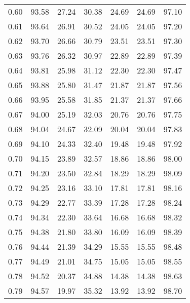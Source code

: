 \begin{tabular}{|c|c|c|c|c|c|c|}
      0.60 &     93.58 &     27.24 &      30.38 &   24.69 &      24.69 &         97.10 \\
      0.61 &     93.64 &     26.91 &      30.52 &   24.05 &      24.05 &         97.20 \\
      0.62 &     93.70 &     26.66 &      30.79 &   23.51 &      23.51 &         97.30 \\
      0.63 &     93.76 &     26.32 &      30.97 &   22.89 &      22.89 &         97.39 \\
      0.64 &     93.81 &     25.98 &      31.12 &   22.30 &      22.30 &         97.47 \\
      0.65 &     93.88 &     25.80 &      31.47 &   21.87 &      21.87 &         97.56 \\
      0.66 &     93.95 &     25.58 &      31.85 &   21.37 &      21.37 &         97.66 \\
      0.67 &     94.00 &     25.19 &      32.03 &   20.76 &      20.76 &         97.75 \\
      0.68 &     94.04 &     24.67 &      32.09 &   20.04 &      20.04 &         97.83 \\
      0.69 &     94.10 &     24.33 &      32.40 &   19.48 &      19.48 &         97.92 \\
      0.70 &     94.15 &     23.89 &      32.57 &   18.86 &      18.86 &         98.00 \\
      0.71 &     94.20 &     23.50 &      32.84 &   18.29 &      18.29 &         98.09 \\
      0.72 &     94.25 &     23.16 &      33.10 &   17.81 &      17.81 &         98.16 \\
      0.73 &     94.29 &     22.77 &      33.39 &   17.28 &      17.28 &         98.24 \\
      0.74 &     94.34 &     22.30 &      33.64 &   16.68 &      16.68 &         98.32 \\
      0.75 &     94.38 &     21.80 &      33.80 &   16.09 &      16.09 &         98.39 \\
      0.76 &     94.44 &     21.39 &      34.29 &   15.55 &      15.55 &         98.48 \\
      0.77 &     94.49 &     21.01 &      34.75 &   15.05 &      15.05 &         98.55 \\
      0.78 &     94.52 &     20.37 &      34.88 &   14.38 &      14.38 &         98.63 \\
      0.79 &     94.57 &     19.97 &      35.32 &   13.92 &      13.92 &         98.70 \\

\end{tabular}

